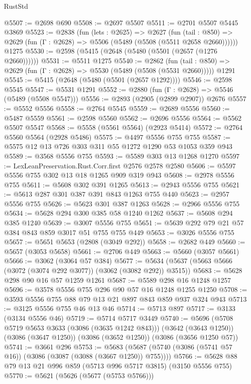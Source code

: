 \begin{lexlean}{RustStd}
\begin{coremodule}
@5507 := @2698 @690
@5508 := @2697 @5507
@5511 := @2701 @5507 @5445 @3869
@5523 := @2838
    (fun (lets : @2625) =>
    @2627
      (fun (tail : @850) => @2629 (fun (Γ : @2628) => @5506 (@5489 (@5508 (@5511 @2658 @2660))))))
    @1275
@5530 := @2598 (@5415 (@2648 (@5480 (@5501 (@2657 (@1276 @2660))))))
@5531 := @5511 @1275
@5540 := @2862
    (fun (tail : @850) => @2629 (fun (Γ : @2628) => @5530 (@5489 (@5508 (@5531 @2660)))))
    @1291
@5545 := @5415 (@2648 (@5480 (@5501 (@2657 @1292))))
@5546 := @2598 @5545
@5547 := @5531 @1291
@5552 := @2880 (fun (Γ : @2628) => @5546 (@5489 (@5508 @5547)))
@5556 := @2893 (@2905 (@2899 @2907)) @2676
@5557 := @5552 @5556
@5558 := @2764 @5545
@5559 := @2689 @5556
@5560 := @5487 @5559
@5561 := @2598 @5560
@5562 := @2696 @5556
@5564 := @5562 @5507 @5547
@5568 := @5558 (@5561 @5564) (@2923 @5414)
@5572 := @2764 @5560 @5564 (@2928 @5486)
@5575 := @4497 @5556 @755 @755
@5587 := @5575 @12 @13 @726 @303 @311 @55 @1272 @1290 @53 @1053 @359 @943
@5589 := @3568 @5556 @755
@5593 := @5589 @303 @13 @1268 @1270
@5597 := LexLeanPreservation.Rust.Corr.first @2576 @2578 @2580
@5606 := @5597 @5556 @755 @302 @13 @18 @1265 @909 @319 @943
@5608 := @2978 @5556 @755
@5611 := @5608 @302 @391 @1265
@5613 := @2943 @5556 @755
@5621 := @5613 @287 @301 @387 @391 @843 @1263 @755 @440
@5623 := @2957 @5556 @755
@5626 := @5623 @301 @387 @1263
@5628 := @2966 @5556 @755
@5634 := @5628 @294 @300 @385 @58 @1240 @1262
@5637 := @5608 @294 @385 @1240
@5639 := @3007 @5556 @755
@5651 := @5639 @292 @79 @21 @57 @384 @843 @859 @3017 @51 @755 @755 @449
@5653 := @3026 @5556 @755
@5657 := @5651 @5653 (@2808 (@3049 @292))
@5658 := @2682 @449
@5660 := @5657 (@3053 @5658)
@5661 := @2706 @449
@5663 := @5660 (@3057 @5661)
@5666 := @3062 (@3064 @57 @384)
@5677 := @5634 (@5637 (@5663 @5666 (@3072 (@3074 @292 @3077)) (@3062 (@3082 @292)) @3515))
@5683 := @5628 @298 @90 @16 @57 @1259 @1261
@5687 := @5589 @298 @16 @1248 @1257
@5696 := @3578 @5556 @755 @296 @90 @57 @16 @1248 @1255 @1250
@5708 := @3593 @5556 @755 @88 @79 @13 @21 @897 @843 @859 @937 @324 @943
@5713 := @3125 @5556 @755 @46 @13 @46
@5714 := @5713 @897
@5717 := @3133 (@3134 @5556 @46)
@5719 := @5714 @5717 @3449
@5740 := @5696
    (@5708 @5719 @5653 @3633 (@3086 (@3635 @1242 @843)))
    (@3642 (@3643 @1250))
    (@3086 (@3647 @1250))
    (@3086 (@3652 @1250))
    (@3086 (@3656 @1250 @57))
@5741 := @3661 @296
@5753 := @5683 (@5687 (@5740 (@3086 (@5741 @57 @16)) (@3086 (@3087 (@3088 (@3667 @1250)) @755))))
@5766 := @5628 @88 @79 @13 @21 @996 @859 (@5713 @996 @5717 @3815) (@3150 @5556 @755)
@5770 := @5621 (@5626 (@5677 (@5753 @5766)))

\end{coremodule}
\end{lexlean}
